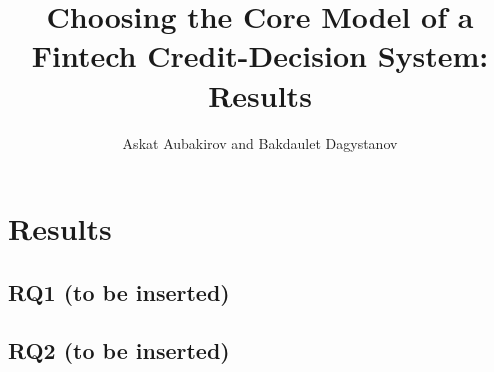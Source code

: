 \documentclass[journal]{IEEEtran}
\begin{document}
\title{Choosing the Core Model of a Fintech Credit-Decision System: Results}
\author{Askat Aubakirov and Bakdaulet Dagystanov}
\maketitle

\section{Results}
\subsection{RQ1 (to be inserted)}\label{subsec:rq1}
\subsection{RQ2 (to be inserted)}\label{subsec:rq2}


\end{document}
